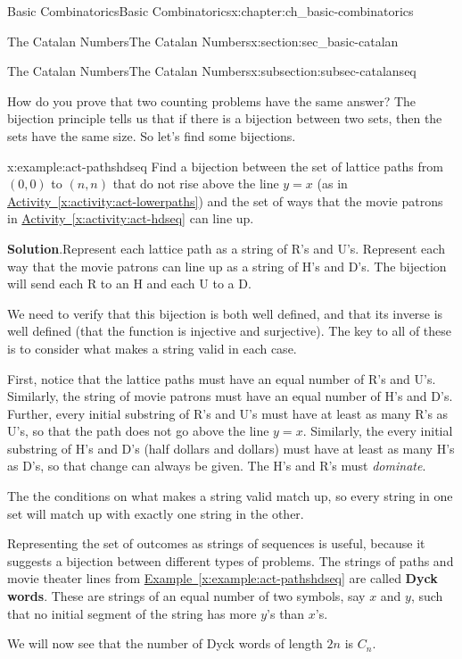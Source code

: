 \documentclass[oneside,10pt,]{book}
\newcommand{\terminology}[1]{\textbf{#1}}
\numberwithin{equation}{chapter}
\begin{document}
\begin{chapterptx}{Basic Combinatorics}{}{Basic Combinatorics}{}{}{x:chapter:ch_basic-combinatorics}
\begin{sectionptx}{The Catalan Numbers}{}{The Catalan Numbers}{}{}{x:section:sec_basic-catalan}
\begin{subsectionptx}{The Catalan Numbers}{}{The Catalan Numbers}{}{}{x:subsection:subsec-catalanseq}
\par
How do you prove that two counting problems have the same answer?  The bijection principle tells us that if there is a bijection between two sets, then the sets have the same size.  So let's find some bijections.%
\begin{example}{}{x:example:act-pathshdseq}%
Find a bijection between the set of lattice paths from \((0,0)\) to \((n,n)\) that do not rise above the line \(y = x\) (as in \hyperref[x:activity:act-lowerpaths]{Activity~\ref{x:activity:act-lowerpaths}}) and the set of ways that the movie patrons in \hyperref[x:activity:act-hdseq]{Activity~\ref{x:activity:act-hdseq}} can line up.%
\par\smallskip%
\noindent\textbf{Solution}.\hypertarget{g:solution:idm3734}{}\quad{}Represent each lattice path as a string of R's and U's.  Represent each way that the movie patrons can line up as a string of H's and D's.  The bijection will send each R to an H and each U to a D.%
\par
We need to verify that this bijection is both well defined, and that its inverse is well defined (that the function is injective and surjective).  The key to all of these is to consider what makes a string valid in each case.%
\par
First, notice that the lattice paths must have an equal number of R's and U's.  Similarly, the string of movie patrons must have an equal number of H's and D's. Further, every initial substring of R's and U's must have at least as many R's as U's, so that the path does not go above the line \(y=x\).  Similarly, the every initial substring of H's and D's (half dollars and dollars) must have at least as many H's as D's, so that change can always be given.  The H's and R's must \emph{dominate}.%
\par
The the conditions on what makes a string valid match up, so every string in one set will match up with exactly one string in the other.%
\end{example}
Representing the set of outcomes as strings of sequences is useful, because it suggests a bijection between different types of problems.  The strings of paths and movie theater lines from \hyperref[x:example:act-pathshdseq]{Example~\ref{x:example:act-pathshdseq}} are called \terminology{Dyck words}.  These are strings of an equal number of two symbols, say \(x\) and \(y\), such that no initial segment of the string has more \(y\)'s than \(x\)'s.%
\par
We will now see that the number of Dyck words of length \(2n\) is \(C_n\).%

\end{subsectionptx}
\end{sectionptx}
\end{chapterptx}
\end{document}
